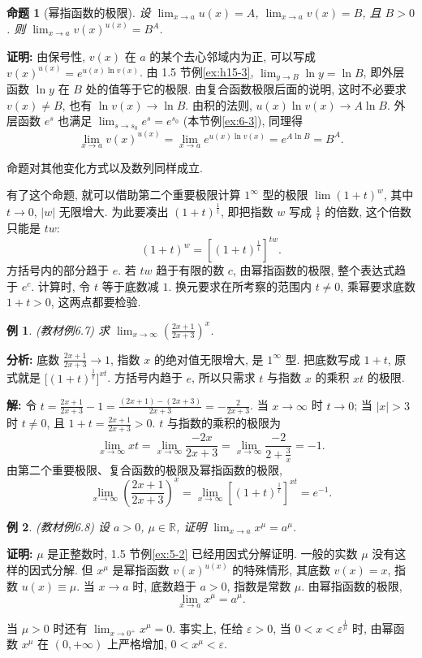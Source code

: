 \documentclass[UTF8,openany]{ctexbook}
\theoremstyle{chinesetextbook}
\newtheorem{example}{例}[section]
\newenvironment{cnproof}{\par\indent\textbf{证明:} \ignorespaces}{\par}
\newenvironment{cnsolution}{\par\indent\textbf{解:} \ignorespaces}{\par}
\newtheorem*{propositionsingle}{命题}
\begin{document}
\begin{propositionsingle}[幂指函数的极限]
设 $\displaystyle\lim_{x\to a}u(x)=A$, $\displaystyle\lim_{x\to a}v(x)=B$, 且 $B>0$. 则 $\displaystyle\lim_{x\to a}v(x)^{u(x)}=B^A$.
\end{propositionsingle}
\begin{cnproof}
由保号性, $v(x)$ 在 $a$ 的某个去心邻域内为正, 可以写成 $v(x)^{u(x)}=e^{u(x)\ln v(x)}$. 由 1.5 节例\ref{ex:h15-3}, $\displaystyle\lim_{y\to B}\ln y=\ln B$, 即外层函数 $\ln y$ 在 $B$ 处的值等于它的极限. 由复合函数极限后面的说明, 这时不必要求 $v(x)\ne B$, 也有 $\ln v(x)\to\ln B$. 由积的法则, $u(x)\ln v(x)\to A\ln B$. 外层函数 $e^s$ 也满足 $\displaystyle\lim_{s\to s_0}e^s=e^{s_0}$ (本节例\ref{ex:6-3}), 同理得
\[
\lim_{x\to a}v(x)^{u(x)}=\lim_{x\to a}e^{u(x)\ln v(x)}=e^{A\ln B}=B^A.
\]
\end{cnproof}
命题对其他变化方式以及数列同样成立.

有了这个命题, 就可以借助第二个重要极限计算 $1^\infty$ 型的极限 $\displaystyle\lim(1+t)^w$, 其中 $t\to0$, $|w|$ 无限增大. 为此要凑出 $(1+t)^{\frac1t}$, 即把指数 $w$ 写成 $\displaystyle\frac1t$ 的倍数, 这个倍数只能是 $tw$:
\[
(1+t)^w=\left[(1+t)^{\frac1t}\right]^{tw}.
\]
方括号内的部分趋于 $e$. 若 $tw$ 趋于有限的数 $c$, 由幂指函数的极限, 整个表达式趋于 $e^c$. 计算时, 令 $t$ 等于底数减 $1$. 换元要求在所考察的范围内 $t\ne0$, 乘幂要求底数 $1+t>0$, 这两点都要检验.
\begin{example}\label{ex:6-7}
\textnormal{(教材例6.7)} 求 $\displaystyle\lim_{x\to\infty}\left(\frac{2x+1}{2x+3}\right)^x$.
\end{example}
\par\indent\textbf{分析:} 底数 $\displaystyle\frac{2x+1}{2x+3}\to1$, 指数 $x$ 的绝对值无限增大, 是 $1^\infty$ 型. 把底数写成 $1+t$, 原式就是 $\bigl[(1+t)^{\frac1t}\bigr]^{xt}$. 方括号内趋于 $e$, 所以只需求 $t$ 与指数 $x$ 的乘积 $xt$ 的极限.
\begin{cnsolution}
令 $\displaystyle t=\frac{2x+1}{2x+3}-1=\frac{(2x+1)-(2x+3)}{2x+3}=-\frac2{2x+3}$. 当 $x\to\infty$ 时 $t\to0$; 当 $|x|>3$ 时 $t\ne0$, 且 $\displaystyle1+t=\frac{2x+1}{2x+3}>0$. $t$ 与指数的乘积的极限为
\[
\lim_{x\to\infty}xt=\lim_{x\to\infty}\frac{-2x}{2x+3}=\lim_{x\to\infty}\frac{-2}{2+\frac3x}=-1.
\]
由第二个重要极限、复合函数的极限及幂指函数的极限,
\[
\lim_{x\to\infty}\left(\frac{2x+1}{2x+3}\right)^x=\lim_{x\to\infty}\left[(1+t)^{\frac1t}\right]^{xt}=e^{-1}.
\]
\end{cnsolution}
\begin{example}\label{ex:6-8}
\textnormal{(教材例6.8)} 设 $a>0$, $\mu\in\mathbb R$, 证明 $\displaystyle\lim_{x\to a}x^\mu=a^\mu$.
\end{example}
\begin{cnproof}
$\mu$ 是正整数时, 1.5 节例\ref{ex:5-2} 已经用因式分解证明. 一般的实数 $\mu$ 没有这样的因式分解. 但 $x^\mu$ 是幂指函数 $v(x)^{u(x)}$ 的特殊情形, 其底数 $v(x)=x$, 指数 $u(x)\equiv\mu$. 当 $x\to a$ 时, 底数趋于 $a>0$, 指数是常数 $\mu$. 由幂指函数的极限,
\[
\lim_{x\to a}x^\mu=a^\mu.
\]
\end{cnproof}
当 $\mu>0$ 时还有 $\displaystyle\lim_{x\to0^+}x^\mu=0$. 事实上, 任给 $\varepsilon>0$, 当 $0<x<\varepsilon^{\frac1\mu}$ 时, 由幂函数 $x^\mu$ 在 $(0,+\infty)$ 上严格增加, $0<x^\mu<\varepsilon$.
\end{document}
